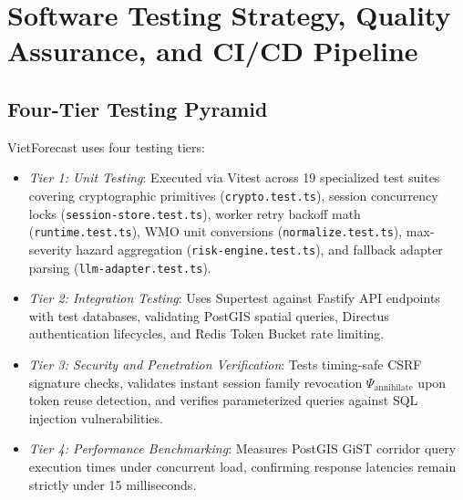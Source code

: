 \section{Software Testing Strategy, Quality Assurance, and CI/CD Pipeline}
\label{sec:testing_qa_strategy}

\subsection{Four-Tier Testing Pyramid}
VietForecast uses four testing tiers:
\begin{itemize}
    \item[-] \textit{Tier 1: Unit Testing}: Executed via Vitest across 19 specialized test suites covering cryptographic primitives (\texttt{crypto.}\allowbreak\texttt{test.ts}), session concurrency locks (\texttt{session-}\allowbreak\texttt{store.}\allowbreak\texttt{test.ts}), worker retry backoff math (\texttt{runtime.}\allowbreak\texttt{test.ts}), WMO unit conversions (\texttt{normalize.}\allowbreak\texttt{test.ts}), max-severity hazard aggregation (\texttt{risk-}\allowbreak\texttt{engine.}\allowbreak\texttt{test.ts}), and fallback adapter parsing (\texttt{llm-}\allowbreak\texttt{adapter.}\allowbreak\texttt{test.ts}).
    \item[-] \textit{Tier 2: Integration Testing}: Uses Supertest against Fastify API endpoints with test databases, validating PostGIS spatial queries, Directus authentication lifecycles, and Redis Token Bucket rate limiting.
    \item[-] \textit{Tier 3: Security and Penetration Verification}: Tests timing-safe CSRF signature checks, validates instant session family revocation $\Psi_{\text{annihilate}}$ upon token reuse detection, and verifies parameterized queries against SQL injection vulnerabilities.
    \item[-] \textit{Tier 4: Performance Benchmarking}: Measures PostGIS GiST corridor query execution times under concurrent load, confirming response latencies remain strictly under 15 milliseconds.
\end{itemize}


